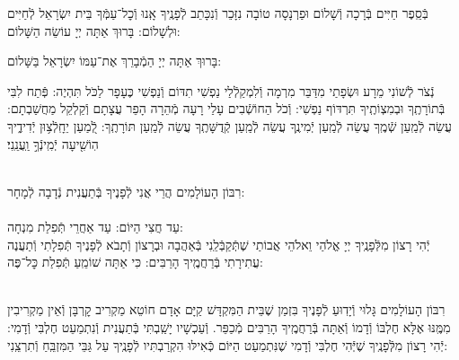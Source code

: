 \documentclass[twoside, openany, parskip=half, 11pt]{book}
\begin{document}
\begin{paracol}{2}
\begin{small}
בְּֿסֵֽפֶר חַיִּים בְּֿרָכָה וְֿשָׁלוֹם וּפַרְנָסָה טוֹבָה נִזָּכֵר וְֿנִכָּתֵב לְֿפָנֶֽיךָ אָֽנוּ וְֿכׇל־עַמְּֿךָ בֵּית יִשְׂרָאֵל לְֿחַיִּים וּלְשָׁלוֹם: בָּרוּךְ אַתָּה יְיָ עוֹשֵׂה הַשָּׁלוֹם:

\end{small}
\switchcolumn
בָּרוּךְ אַתָּה יְיָ הַמְֿבָרֵךְ אֶת־עַמּוֹ יִשְׂרָאֵל בַּשָּׁלוֹם:

\end{paracol}

נְֿצֹר לְֿשׁוֹנִי מֵרָע וּשְׂפָתַי מִדַּבֵּר מִרְמָה וְֿלִמְקַלְֿלַי נַפְשִׁי תִדּוֹם וְֿנַפְשִׁי כֶּעָפָר לַכֹּל תִּהְיֶה: פְּֿתַח לִבִּי בְּֿתוֹרָתֶֽךָ וּבְמִצְוֹתֶֽיךָ תִּרְדּוֹף נַפְשִׁי: וְֿכֹל הַחוֹשְֿׁבִים עָלַי רָעָה מְֿהֵרָה הָפֵר עֲצָתָם וְֿקַלְקֵל מַחֲשַׁבְתָם: עֲשֵׂה לְֿמַֽעַן שְֿׁמֶֽךָ עֲשֵׂה לְֿמַֽעַן יְֿמִינֶֽךָ עֲשֵׂה לְֿמַֽעַן קְֿדֻשָּׁתֶֽךָ עֲשֵׂה לְֿמַֽעַן תּוֹרָתֶֽךָ: לְֿ֭מַעַן יֵחָֽלְֿצ֥וּן יְֿדִידֶ֑יךָ הֽוֹשִׁ֖יעָה יְֿמִֽינְֿךָ֣ וַֽעֲנֵֽנִי׃

\begin{sometimes}

\\
רִבּוֹן הָעוֹלָמִים הֲרֵי אֲנִי לְֿפָנֶיךָ בְּֿתַעֲנִית נְֿדָבָה לְֿמָחָר:\\
\\
עַד חֲצִי הַיּוֹם:  עַד אַחֲרֵי תְּֿפִלַת מִנְחָה:\\
יְֿהִי רָצוֹן מִלְּֿפָנֶֽיךָ יְיָ אֱלֹהַי וֵאלֹהֵי אֲבוֹתַי שֶׁתְּֿקַבְּֿלֵֽנִי בְּֿאַהֲבָה וּבְרָצוֹן וְֿתָבֹא לְֿפָנֶיךָ תְּֿפִלָתִי
וְֿתַעֲנֶה עֲתִירָתִי בְּֿרַחֲמֶֽיךָ הָרַבִּים: כִּי אַתָּה שׁוֹמֵֽעַ תְּֿפִלַת כׇּל־פֶּה: 

\sepline

\\
רִבּוֹן הָעוֹלָמִים גָּלוּי וְֿיָדֽוּעַ לְֿפָנֶיךָ בִּזְמַן שֶׁבֵּית הַמִּקְדָּשׁ קַיָּם אָדָם חוֹטֵא מַקְרִיב קׇרְבָּן וְֿאֵין מַקְרִיבִין מִמֶּֽנּוּ אֶלָּא חֶלְבּוֹ וְֿדָמוֹ וְֿאַתָּה בְּֿרַחֲמֶֽיךָ הָרַבִּים מְֿכַפֵּר. וְֿעַכְשָׁיו יָשַֽׁבְתִּי בְּֿתַעֲנִית וְֿנִתְמַעֵט חֶלְבִּי וְֿדָמִי: יְֿהִי רָצוֹן מִלְּֿפָנֶֽיךָ שֶׁיְּֿהִי חֶלְבִּי וְֿדָמִי שֶׁנִּתְמַעַט הַיּוֹם כְּֿאִילּוּ הִקְרַבְתִּיו לְֿפָנֶֽיךָ עַל גַּבֵּי הַמִּזְבֵּֽחַ וְֿתִרְצֵֽנִי:


\end{sometimes}
\end{document}

